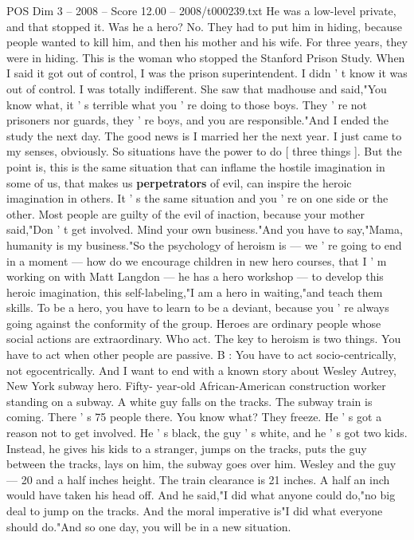 \begin{textsample}{POS Dim 3 – 2008 – Score 12.00 – 2008/t000239.txt}
He was a low-level private, and that stopped it.
Was he a hero?
No.
They had to put him in hiding, because people wanted to kill him, and then his mother and his wife.
For three years, they were in hiding.
This is the woman who stopped the Stanford Prison Study.
When I said it got out of control, I was the prison superintendent.
I didn ' t know it was out of control.
I was totally indifferent.
She saw that madhouse and said,"You know what, it ' s terrible what you ' re doing to those boys.
They ' re not prisoners nor guards, they ' re boys, and you are responsible."And I ended the study the next day.
The good news is I married her the next year.
I just came to my senses, obviously.
So situations have the power to do [ three things ].
But the point is, this is the same situation that can inflame the hostile imagination in some of us, that makes us \textbf{perpetrators} of evil, can inspire the heroic imagination in others.
It ' s the same situation and you ' re on one side or the other.
Most people are guilty of the evil of inaction, because your mother said,"Don ' t get involved.
Mind your own business."And you have to say,"Mama, humanity is my business."So the psychology of heroism is — we ' re going to end in a moment — how do we encourage children in new hero courses, that I ' m working on with Matt Langdon — he has a hero workshop — to develop this heroic imagination, this self-labeling,"I am a hero in waiting,"and teach them skills.
To be a hero, you have to learn to be a deviant, because you ' re always going against the conformity of the group.
Heroes are ordinary people whose social actions are extraordinary.
Who act.
The key to heroism is two things.
You have to act when other people are passive.
B : You have to act socio-centrically, not egocentrically.
And I want to end with a known story about Wesley Autrey, New York subway hero.
Fifty- year-old African-American construction worker standing on a subway.
A white guy falls on the tracks.
The subway train is coming.
There ' s 75 people there.
You know what?
They freeze.
He ' s got a reason not to get involved.
He ' s black, the guy ' s white, and he ' s got two kids.
Instead, he gives his kids to a stranger, jumps on the tracks, puts the guy between the tracks, lays on him, the subway goes over him.
Wesley and the guy — 20 and a half inches height.
The train clearance is 21 inches.
A half an inch would have taken his head off.
And he said,"I did what anyone could do,"no big deal to jump on the tracks.
And the moral imperative is"I did what everyone should do."And so one day, you will be in a new situation.

\end{textsample}
